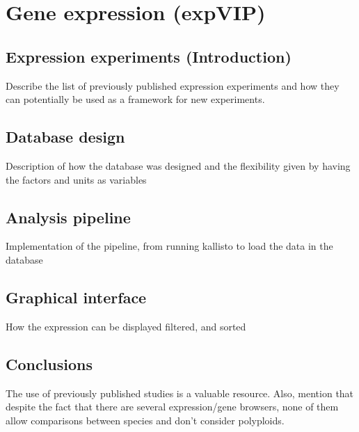 
\chapter{Gene expression (expVIP)}

\section{Expression experiments (Introduction)} 
Describe the list of previously published expression experiments and how they can potentially be used as a framework for new experiments.  

\section{Database design} 
Description of how the database was designed and the flexibility given by having the factors and units as variables

\section{Analysis pipeline} 
Implementation of the pipeline, from running kallisto to load the data in the database 

\section{Graphical interface}  
How the expression can be displayed filtered, and sorted

\section{Conclusions} 
The use of previously published studies is a valuable resource. Also, mention that despite the fact that there are several expression/gene browsers, none of them allow comparisons between species and don't consider polyploids. 
